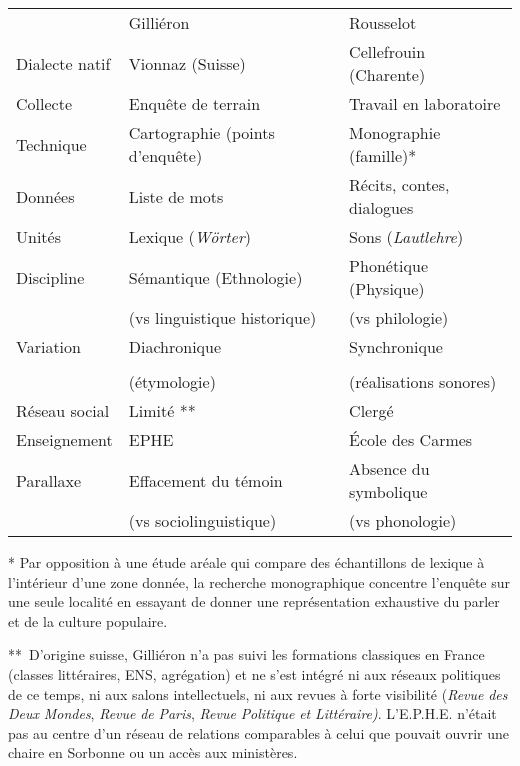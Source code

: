 \documentclass[output=paper]{langsci/langscibook}
\begin{document}
\begin{table}[]
    
\begin{tabularx}{\textwidth}{X X X}

& Gilliéron        &       Rousselot \\ 

Dialecte natif  & Vionnaz (Suisse)    &   Cellefrouin (Charente) \\

Collecte & Enquête de terrain   &   Travail en laboratoire \\

Technique & Cartographie (points d’enquête)  &  Monographie (famille)*\\

Données &  Liste de mots   &     Récits, contes, dialogues\\

Unités  &   Lexique (\textit{Wörter})  &    Sons (\textit{Lautlehre})\\

Discipline & Sémantique (Ethnologie) &   Phonétique (Physique)\\

   & (vs linguistique historique)  &  (vs philologie)\\

Variation &  Diachronique    &    Synchronique \\
\\
  &  (étymologie)     &   (réalisations sonores) \\

Réseau   social & Limité **    &    Clergé \\

Enseignement & EPHE      &    École des Carmes \\

Parallaxe & Effacement du témoin  &    Absence du symbolique\\

 &   (vs sociolinguistique)  &    (vs phonologie)\\
\end{tabularx}
\medskip

* Par opposition à une étude aréale qui compare des échantillons de lexique à l’intérieur d’une zone donnée, la recherche monographique concentre l’enquête sur une seule localité en essayant de donner une représentation exhaustive du parler et de la culture populaire. \medskip

**~D’origine suisse, Gilliéron n’a pas suivi les formations classiques en France (classes littéraires, ENS, agrégation) et ne s’est intégré ni aux réseaux politiques de ce temps, ni aux salons intellectuels, ni aux revues à forte visibilité (\textit{Revue} \textit{des} \textit{Deux} \textit{Mondes}, \textit{Revue} \textit{de} \textit{Paris}, \textit{Revue} \textit{Politique} \textit{et} \textit{Littéraire)}. L’E.P.H.E. n’était pas au centre d’un réseau de relations comparables à celui que pouvait ouvrir une chaire en Sorbonne ou un accès aux ministères.

\label{table: Tab 2.}

\end{table}
\end{document}
